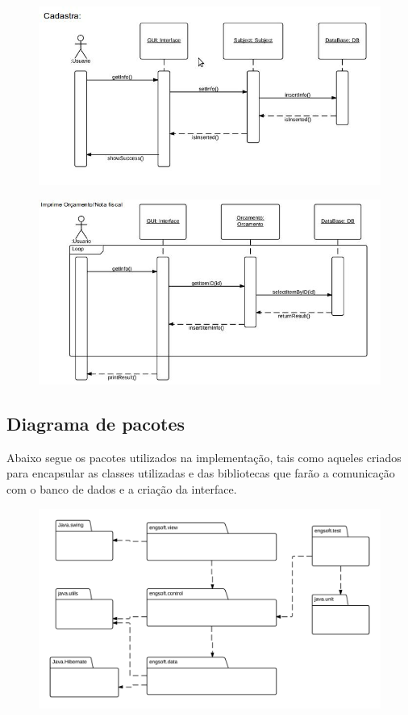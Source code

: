 \documentclass[a4paper,10pt]{article}
\begin{document}
\begin{figure}[H]
\centering
\includegraphics[width=1\textwidth]{pic/sequencia_1.jpeg}
\end{figure}

\begin{figure}[H]
\centering
\includegraphics[width=1\textwidth]{pic/sequencia_2.jpeg}
\end{figure}

\subsection{Diagrama de pacotes}

Abaixo segue os pacotes utilizados na implementação, tais como aqueles criados para encapsular as classes utilizadas e das bibliotecas que farão a comunicação com o banco de dados e a criação da interface.

\begin{figure}[H]
\centering
\includegraphics[width=1\textwidth]{pic/pacotes.png}
\end{figure}
\end{document}
